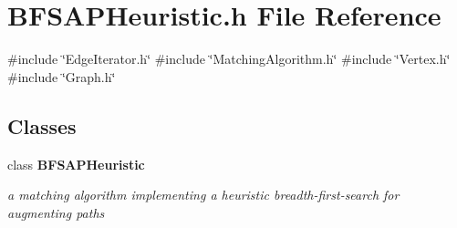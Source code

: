 \section{B\+F\+S\+A\+P\+Heuristic.\+h File Reference}
\label{BFSAPHeuristic_8h}
{\ttfamily \#include \char`\"{}Edge\+Iterator.\+h\char`\"{}}\newline
{\ttfamily \#include \char`\"{}Matching\+Algorithm.\+h\char`\"{}}\newline
{\ttfamily \#include \char`\"{}Vertex.\+h\char`\"{}}\newline
{\ttfamily \#include \char`\"{}Graph.\+h\char`\"{}}\newline
\subsection*{Classes}
\begin{DoxyCompactItemize}
\item 
class \textbf{ B\+F\+S\+A\+P\+Heuristic}
\begin{DoxyCompactList}\small\item\em a matching algorithm implementing a heuristic breadth-\/first-\/search for augmenting paths \end{DoxyCompactList}\end{DoxyCompactItemize}
